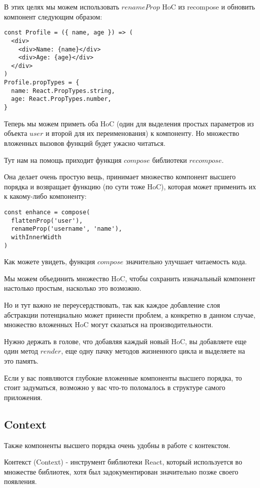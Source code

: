 В этих целях мы можем использовать $renameProp$ HoC из recompose и обновить компонент следующим образом:

\begin{lstlisting}
const Profile = ({ name, age }) => (
  <div>
    <div>Name: {name}</div>
    <div>Age: {age}</div>
  </div>
)
Profile.propTypes = {
  name: React.PropTypes.string,
  age: React.PropTypes.number,
}
\end{lstlisting}

Теперь мы можем приметь оба HoC (один для выделения простых параметров из объекта $user$ и второй для их переименования) к компоненту. Но множество вложенных вызовов функций будет ужасно читаться.

Тут нам на помощь приходит функция $compose$ библиотеки $recompose$.

Она делает очень простую вещь, принимает множество компонент высшего порядка и возвращает функцию (по сути тоже HoC), которая может применить их к какому-либо компоненту:

\begin{lstlisting}
const enhance = compose(
  flattenProp('user'),
  renameProp('username', 'name'),
  withInnerWidth
)
\end{lstlisting}

Как можете увидеть, функция $compose$ значительно улучшает читаемость кода.

Мы можем объединить множество HoC, чтобы сохранить изначальный компонент настолько простым, насколько это возможно.

Но и тут важно не переусердствовать, так как каждое добавление слоя абстракции потенциально может принести проблем, а конкретно в данном случае, множество вложенных HoC могут сказаться на производительности.

Нужно держать в голове, что добавляя каждый новый HoC, вы добавляете еще один метод $render$, еще одну пачку методов жизненного цикла и выделяете на это память.

Если у вас появляются глубокие вложенные компоненты высшего порядка, то стоит задуматься, возможно у вас что-то поломалось в структуре самого приложения.

\subsection*{Context}

Также компоненты высшего порядка очень удобны в работе с контекстом.

Контекст (Context) - инструмент библиотеки React, который используется во множестве библиотек, хотя был задокументирован значительно позже своего появления.

